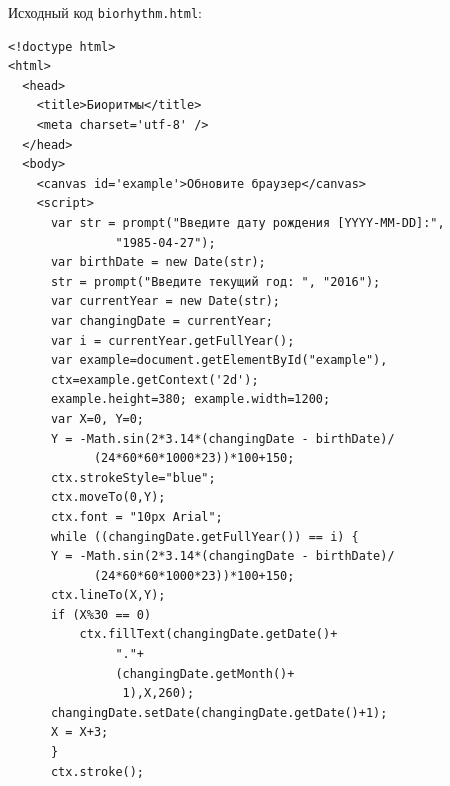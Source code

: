 Исходный код \verb|biorhythm.html|:

\begin{verbatim}
<!doctype html>
<html>
  <head>
    <title>Биоритмы</title>
    <meta charset='utf-8' />
  </head>
  <body>
    <canvas id='example'>Обновите браузер</canvas>
    <script>
      var str = prompt("Введите дату рождения [YYYY-MM-DD]:",
		       "1985-04-27");
      var birthDate = new Date(str);
      str = prompt("Введите текущий год: ", "2016");
      var currentYear = new Date(str);
      var changingDate = currentYear;
      var i = currentYear.getFullYear();
      var example=document.getElementById("example"),
	  ctx=example.getContext('2d');
      example.height=380; example.width=1200;
      var X=0, Y=0;
      Y = -Math.sin(2*3.14*(changingDate - birthDate)/
		    (24*60*60*1000*23))*100+150;
      ctx.strokeStyle="blue";
      ctx.moveTo(0,Y);
      ctx.font = "10px Arial";
      while ((changingDate.getFullYear()) == i) {
	  Y = -Math.sin(2*3.14*(changingDate - birthDate)/
			(24*60*60*1000*23))*100+150;
	  ctx.lineTo(X,Y);
	  if (X%30 == 0)
	      ctx.fillText(changingDate.getDate()+
			   "."+
			   (changingDate.getMonth()+
			    1),X,260);
	  changingDate.setDate(changingDate.getDate()+1);
	  X = X+3;
      }
      ctx.stroke();


\end{verbatim}
